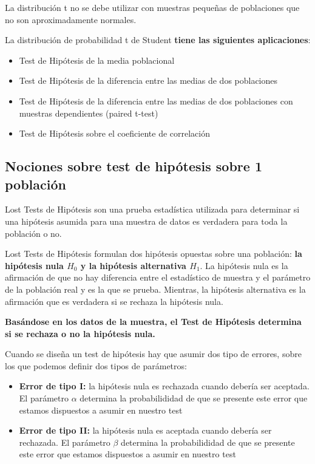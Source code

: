 \documentclass[11pt]{article}
\providecommand{\tightlist}{%
      \setlength{\itemsep}{0pt}\setlength{\parskip}{0pt}}
\begin{document}
La distribución t no se debe utilizar con muestras pequeñas de
poblaciones que no son aproximadamente normales.

La distribución de probabilidad t de Student \textbf{tiene las
siguientes aplicaciones}:

\begin{itemize}
\tightlist
\item
  Test de Hipótesis de la media poblacional
\item
  Test de Hipótesis de la diferencia entre las medias de dos poblaciones
\item
  Test de Hipótesis de la diferencia entre las medias de dos poblaciones
  con muestras dependientes (paired t-test)
\item
  Test de Hipótesis sobre el coeficiente de correlación
\end{itemize}

    \subsection{Nociones sobre test de hipótesis sobre 1
población}\label{nociones-sobre-test-de-hipuxf3tesis-sobre-1-poblaciuxf3n}

Lost Tests de Hipótesis son una prueba estadística utilizada para
determinar si una hipótesis asumida para una muestra de datos es
verdadera para toda la población o no.

Lost Tests de Hipótesis formulan dos hipótesis opuestas sobre una
población: \textbf{la hipótesis nula \(H_0\) y la hipótesis alternativa
\(H_1\)}. La hipótesis nula es la afirmación de que no hay diferencia
entre el estadístico de muestra y el parámetro de la población real y es
la que se prueba. Mientras, la hipótesis alternativa es la afirmación
que es verdadera si se rechaza la hipótesis nula.

\textbf{Basándose en los datos de la muestra, el Test de Hipótesis
determina si se rechaza o no la hipótesis nula.}

Cuando se diseña un test de hipótesis hay que asumir dos tipo de
errores, sobre los que podemos definir dos tipos de parámetros:

\begin{itemize}
\tightlist
\item
  \textbf{Error de tipo I:} la hipótesis nula es rechazada cuando
  debería ser aceptada. El parámetro \(\alpha\) determina la
  probabilididad de que se presente este error que estamos dispuestos a
  asumir en nuestro test
\item
  \textbf{Error de tipo II:} la hipótesis nula es aceptada cuando
  debería ser rechazada. El parámetro \(\beta\) determina la
  probabilididad de que se presente este error que estamos dispuestos a
  asumir en nuestro test
\end{itemize}
\end{document}
